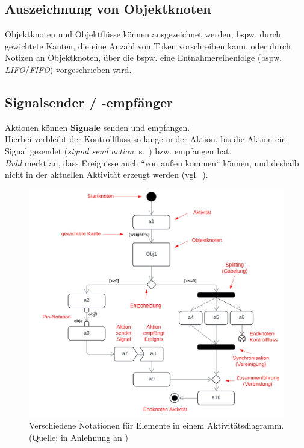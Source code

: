 \subsection{Auszeichnung von Objektknoten}
Objektknoten und Objektflüsse können ausgezeichnet werden, bspw. durch gewichtete Kanten, die eine Anzahl von Token vorschreiben kann, oder durch Notizen an Objektknoten, über die bspw. eine Entnahmereihenfolge (bspw. \textit{LIFO}/\textit{FIFO}) vorgeschrieben wird.

\subsection{Signalsender / -empfänger}
Aktionen können \textbf{Signale} senden und empfangen.\\
Hierbei verbleibt der Kontrollfluss so lange in der Aktion, bis die Aktion ein Signal gesendet (\textit{signal send action}, s.~\cite[76]{Buh09}) bzw. empfangen hat.\\
\textit{Buhl} merkt an, dass Ereignisse auch ``von außen kommen`` können, und deshalb nicht in der aktuellen Aktivität erzeugt werden (vgl.~\cite[63]{Buh09}).


\begin{figure}
    \centering
    \includegraphics[scale=0.35]{part three/Aktivitätsdiagramme/img/aktivitätsdiagramm-notation}
    \caption{Verschiedene Notationen für Elemente in einem Aktivitätsdiagramm. (Quelle: in Anlehnung an \cite[326, Abb. 6.9-16]{Bal05})}
    \label{fig:aktivitätsdiagramm-notation}
\end{figure}